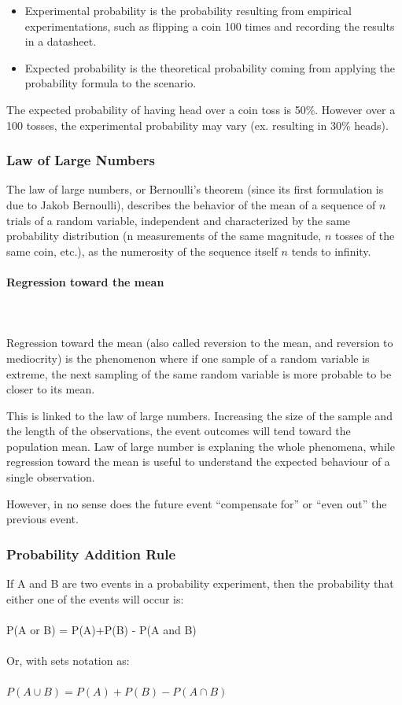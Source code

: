 \documentclass{article}
\begin{document}
\begin{itemize}
    \item Experimental probability is the probability resulting from empirical experimentations, such as flipping a coin 100 times and recording the results in a datasheet.
    \item Expected probability is the theoretical probability coming from applying the probability formula to the scenario.
\end{itemize}

The expected probability of having head over a coin toss is 50\%. However over a 100 tosses, the experimental probability may vary (ex. resulting in 30\% heads).

\subsubsection{Law of Large Numbers}
The law of large numbers, or Bernoulli's theorem (since its first formulation is due to Jakob Bernoulli), describes the behavior of the mean of a sequence of $n$ trials of a random variable, independent and characterized by the same probability distribution (n measurements of the same magnitude, $n$ tosses of the same coin, etc.), as the numerosity of the sequence itself $n$ tends to infinity.

\paragraph{Regression toward the mean}\mbox{} \\
\mbox{} \\
Regression toward the mean (also called reversion to the mean, and reversion to mediocrity) is the phenomenon where if one sample of a random variable is extreme, the next sampling of the same random variable is more probable to be closer to its mean. 

This is linked to the law of large numbers. Increasing the size of the sample and the length of the observations, the event outcomes will tend toward the population mean. 
Law of large number is explaning the whole phenomena, while regression toward the mean is useful to understand the expected behaviour of a single observation.

However, in no sense does the future event “compensate for” or “even out” the previous event. 

\subsubsection{Probability Addition Rule}
If A and B are two events in a probability experiment, then the probability that either one of the events will occur is: \\ 
\mbox{} \\
P(A or B) = P(A)+P(B) - P(A and B) \\ 
\mbox{} \\
Or, with sets notation as: \\ 
\mbox{} \\
$P(A \cup B) = P(A)+P(B) - P(A \cap B)$ 
\end{document}

